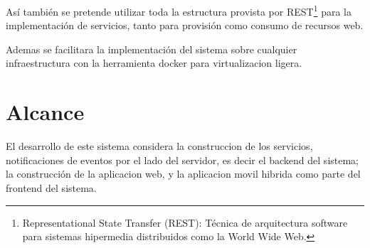 \documentclass[letterpaper,11pt]{article}
\begin{document}
Así también se pretende utilizar toda la estructura provista por
REST\footnote{Representational State Transfer (REST): Técnica de arquitectura
software para sistemas hipermedia distribuidos como la World Wide Web.} para la
implementación de servicios, tanto para provisión como consumo de recursos web.

Ademas se facilitara la implementación del sistema sobre cualquier
infraestructura con la herramienta docker para virtualizacion ligera.

\section{Alcance}
El desarrollo de este sistema considera la construccion de los servicios,
notificaciones de eventos por el lado del servidor, es decir el backend del
sistema; la construcción de la aplicacion web, y la aplicacion movil hibrida
como parte del frontend del sistema.
\end{document}
